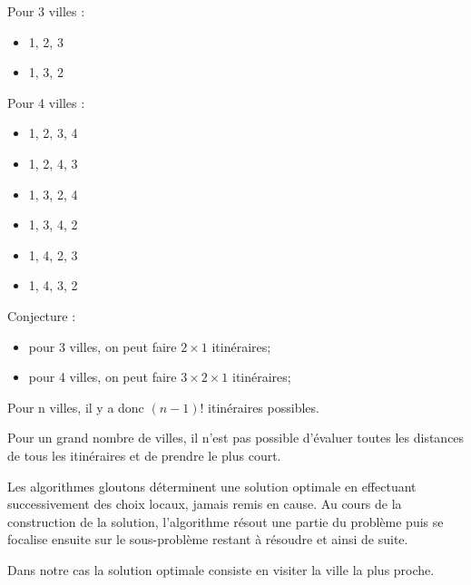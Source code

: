 \ifprof
\begin{corrige}
Pour 3 villes :
\begin{itemize}
\item 1, 2, 3
\item 1, 3, 2
\end{itemize}

Pour 4 villes :
\begin{itemize}
\item 1, 2, 3, 4
\item 1, 2, 4, 3
\item 1, 3, 2, 4
\item 1, 3, 4, 2
\item 1, 4, 2, 3
\item 1, 4, 3, 2
\end{itemize}

Conjecture :
\begin{itemize}
\item pour 3 villes, on peut faire $2\times 1$ itinéraires;
\item pour 4 villes, on peut faire $3\times 2\times 1$ itinéraires;
\end{itemize}

Pour n villes, il y a donc $(n-1)!$ itinéraires possibles.
\end{corrige}
\else
\fi


Pour un grand nombre de villes, il n'est pas possible d'évaluer toutes les distances de tous les itinéraires et de prendre le plus court. 

\begin{defi}
Les algorithmes gloutons déterminent une solution optimale en effectuant successivement des choix locaux, jamais remis en cause. Au cours de la construction de la solution, l’algorithme résout une partie du problème puis se focalise ensuite sur le sous-problème restant à résoudre et ainsi de suite.
\end{defi}

Dans notre cas la solution optimale consiste en visiter la ville la plus proche. 
 
\ifprof
\begin{corrige}
\end{corrige}
\else
\fi

